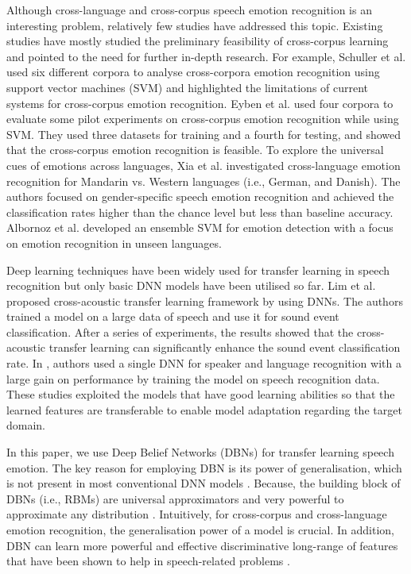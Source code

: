 \documentclass[a4paper]{article}
\begin{document}
Although cross-language and cross-corpus speech emotion recognition is an interesting problem, relatively few studies have addressed this topic. Existing studies have mostly studied the preliminary feasibility of cross-corpus learning and pointed to the need for further in-depth research. For example, Schuller et al. \cite{schuller2010cross} used six different corpora to analyse cross-corpora emotion recognition using support vector machines (SVM) and highlighted the limitations of current systems for cross-corpus emotion recognition. Eyben et al. \cite{eyben2010cross} used four corpora to evaluate some pilot experiments on cross-corpus emotion recognition while using SVM. They used three datasets for training and a fourth for testing, and showed that the cross-corpus emotion recognition is feasible. To explore the universal cues of emotions across languages, Xia et al. \cite{xiao2016speech} investigated cross-language emotion recognition for Mandarin vs. Western languages (i.e., German, and Danish). The authors focused on gender-specific speech emotion recognition and achieved the classification rates higher than the chance level but less than baseline accuracy.  Albornoz et al. \cite{albornoz2017emotion} developed an ensemble SVM for emotion detection with a focus on emotion recognition in unseen languages. 



 Deep learning techniques have been widely used for transfer learning in speech recognition but only basic DNN models have been utilised so far. Lim et al. \cite{lim2016cross} proposed cross-acoustic transfer learning framework by using DNNs. The authors trained a model on a large data of speech and use it for sound event classification. After a series of experiments, the results showed that the cross-acoustic transfer learning can significantly enhance the sound event classification rate. In \cite{richardson2015deep}, authors used a single DNN for speaker and language recognition with a large gain on performance by training the model on speech recognition data. 
 These studies exploited the models that have good learning abilities so that the learned features are transferable to enable model adaptation regarding the target domain. 
 
 

In this paper, we use Deep Belief Networks (DBNs) for transfer learning  speech emotion. The key reason for employing DBN is its power of generalisation, which is not present in most conventional DNN models \cite{lee2010unsupervised}. Because, the building block of DBNs (i.e., RBMs) are universal approximators and very powerful to approximate any distribution \cite{le2008representational}.
Intuitively, for cross-corpus and cross-language emotion recognition, the generalisation power of a model is crucial. In addition, DBN can learn more powerful and effective discriminative long-range of features \cite{hinton2006reducing} that have been shown to help in speech-related problems \cite{deng2010binary}.
\end{document}
